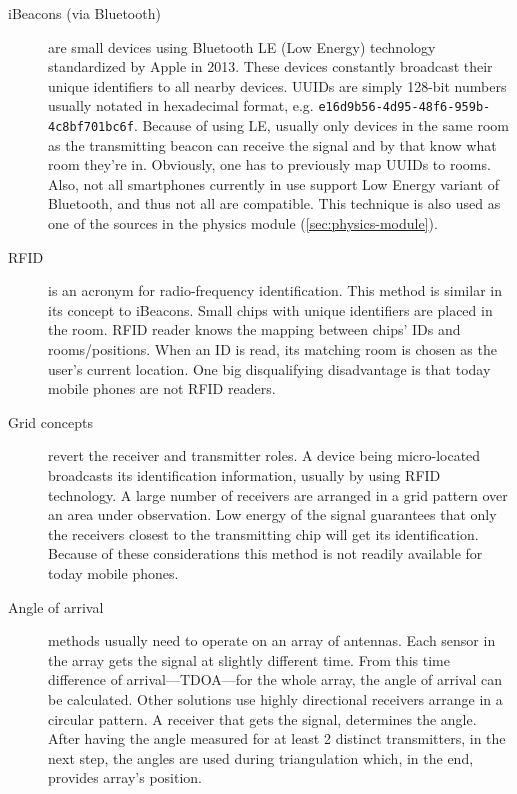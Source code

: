 \begin{description}
	\item[iBeacons (via Bluetooth)] are small devices using Bluetooth LE (Low Energy) technology standardized by Apple in 2013. These devices constantly broadcast their unique identifiers to all nearby devices. UUIDs are simply 128-bit numbers usually notated in hexadecimal format, e.g. \texttt{e16d9b56-4d95-48f6-959b-4c8bf701bc6f}. Because of using LE, usually only devices in the same room as the transmitting beacon can receive the signal and by that know what room they're in. Obviously, one has to previously map UUIDs to rooms. Also, not all smartphones currently in use support Low Energy variant of Bluetooth, and thus not all are compatible. This technique is also used as one of the sources in the physics module (\cref{sec:physics-module}).
	
	\item[RFID] is an acronym for radio-frequency identification. This method is similar in its concept to iBeacons.  Small chips with unique identifiers are placed in the room. RFID reader knows the mapping between chips' IDs and rooms/positions. When an ID is read, its matching room is chosen as the user's current location. One big disqualifying disadvantage is that today mobile phones are not RFID readers.
	
	\item[Grid concepts] revert the receiver and transmitter roles. A device being micro-located broadcasts its identification information, usually by using RFID technology. A large number of receivers are arranged in a grid pattern over an area under observation. Low energy of the signal guarantees that only the receivers closest to the transmitting chip will get its identification. Because of these considerations this method is not readily available for today mobile phones.
	
	\item[Angle of arrival] methods usually need to operate on an array of antennas. Each sensor in the array gets the signal at slightly different time. From this time difference of arrival---TDOA---for the whole array, the angle of arrival can be calculated. Other solutions use highly directional receivers arrange in a circular pattern. A receiver that gets the signal, determines the angle. After having the angle measured for at least 2 distinct transmitters, in the next step, the angles are used during  triangulation which, in the end, provides array's position.
	

\end{description}
